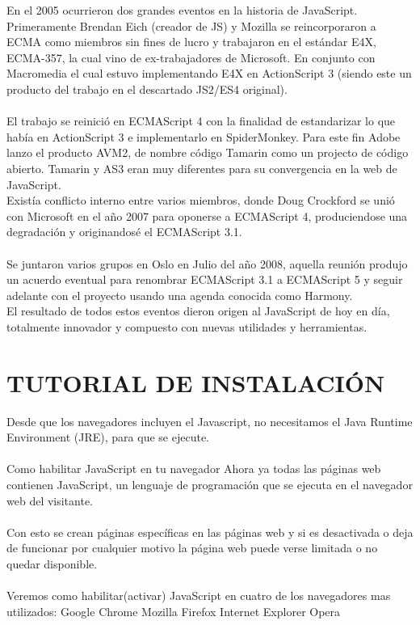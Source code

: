 \documentclass[11pt]{article} %
\begin{document}
En el 2005 ocurrieron dos grandes eventos en la historia de JavaScript. Primeramente Brendan Eich (creador de JS) y Mozilla se reincorporaron a ECMA como miembros sin fines de lucro y trabajaron en el estándar E4X, ECMA-357, la cual vino de ex-trabajadores de Microsoft. En conjunto con Macromedia el cual estuvo implementando E4X en ActionScript 3 (siendo este un producto del trabajo en el descartado JS2/ES4 original).\\\\
El trabajo se reinició en ECMAScript 4 con la finalidad de estandarizar lo que había en ActionScript 3 e implementarlo en SpiderMonkey. Para este fin Adobe lanzo el producto AVM2, de nombre código Tamarin como un projecto de código abierto. Tamarin y AS3 eran muy diferentes para su convergencia en la web de JavaScript.\\
Existía conflicto interno entre varios miembros, donde Doug Crockford se unió con Microsoft en el año 2007 para oponerse a ECMAScript 4, produciendose una degradación y originandosé el ECMAScript 3.1.\\\\
Se juntaron varios grupos en Oslo en Julio del año 2008, aquella reunión produjo un acuerdo eventual para renombrar ECMAScript 3.1 a ECMAScript 5 y seguir adelante con el proyecto usando una agenda conocida como Harmony.\\
El resultado de todos estos eventos dieron origen al JavaScript de hoy en día, totalmente innovador y compuesto con nuevas utilidades y herramientas.\\



\section{TUTORIAL DE INSTALACIÓN}
 Desde que los navegadores incluyen el Javascript, no necesitamos el Java Runtime Environment (JRE), para que se ejecute.
\\  \\
Como habilitar JavaScript en tu navegador 
Ahora ya todas las páginas web contienen  JavaScript, un lenguaje de programación que se ejecuta en el navegador web del visitante. \\\\
Con esto se crean páginas específicas en las páginas web y si es desactivada o deja de funcionar por cualquier motivo la página web puede verse limitada o no quedar disponible.
\\\\
Veremos como habilitar(activar) JavaScript en cuatro de los navegadores mas utilizados:
\newline
\newline* Google Chrome
\newline* Mozilla Firefox
\newline* Internet Explorer
\newline * Opera
\end{document}
